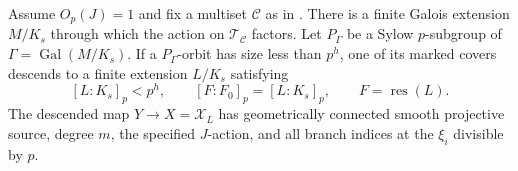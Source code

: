 \begin{proposition}\label{prop:small-orbit-descent}
Assume $O_p(J)=1$ and fix a multiset $\mathcal C$ as in
.  There is a finite Galois
extension $M/K_s$ through which the action on $\mathcal T_{\mathcal C}$
factors.  Let $P_\Gamma$ be a Sylow $p$-subgroup of
$\Gamma=\operatorname{Gal}(M/K_s)$.
If a $P_\Gamma$-orbit has size less than $p^h$, one of its marked covers
descends to a finite extension $L/K_s$ satisfying
\begin{equation}\label{eq:small-orbit-degree}
                [L:K_s]_p<p^h,
                \qquad [F:F_0]_p=[L:K_s]_p,
                \qquad F=\operatorname{res}(L).
\end{equation}
The descended map $Y\to X=\mathcal X_L$ has geometrically connected
smooth projective source, degree $m$, the specified $J$-action, and all
branch indices at the $\xi_i$ divisible by $p$.
\end{proposition}

